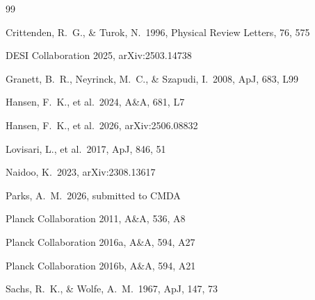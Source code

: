 \documentclass[twocolumn]{article}
\begin{document}

\begin{thebibliography}{99}

Crittenden, R.~G., \& Turok, N.\ 1996, Physical Review Letters, 76, 575

DESI Collaboration 2025, arXiv:2503.14738

Granett, B.~R., Neyrinck, M.~C., \& Szapudi, I.\ 2008, ApJ, 683, L99

Hansen, F.~K., et al.\ 2024, A\&A, 681, L7

Hansen, F.~K., et al.\ 2026, arXiv:2506.08832

Lovisari, L., et al.\ 2017, ApJ, 846, 51

Naidoo, K.\ 2023, arXiv:2308.13617

Parks, A.~M.\ 2026, submitted to CMDA

Planck Collaboration 2011, A\&A, 536, A8

Planck Collaboration 2016a, A\&A, 594, A27

Planck Collaboration 2016b, A\&A, 594, A21

Sachs, R.~K., \& Wolfe, A.~M.\ 1967, ApJ, 147, 73

\end{thebibliography}
\end{document}
